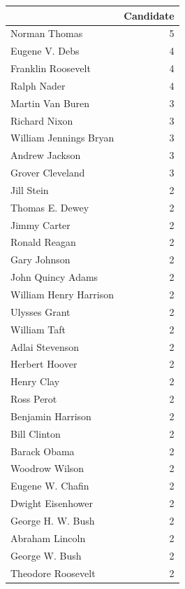\documentclass[
  letterpaper,
  DIV=11,
  numbers=noendperiod]{scrreprt}
\begin{document}
\begin{tabular}{lr}
\toprule
{} &  Candidate \\
\midrule
Norman Thomas          &          5 \\
Eugene V. Debs         &          4 \\
Franklin Roosevelt     &          4 \\
Ralph Nader            &          4 \\
Martin Van Buren       &          3 \\
Richard Nixon          &          3 \\
William Jennings Bryan &          3 \\
Andrew Jackson         &          3 \\
Grover Cleveland       &          3 \\
Jill Stein             &          2 \\
Thomas E. Dewey        &          2 \\
Jimmy Carter           &          2 \\
Ronald Reagan          &          2 \\
Gary Johnson           &          2 \\
John Quincy Adams      &          2 \\
William Henry Harrison &          2 \\
Ulysses Grant          &          2 \\
William Taft           &          2 \\
Adlai Stevenson        &          2 \\
Herbert Hoover         &          2 \\
Henry Clay             &          2 \\
Ross Perot             &          2 \\
Benjamin Harrison      &          2 \\
Bill Clinton           &          2 \\
Barack Obama           &          2 \\
Woodrow Wilson         &          2 \\
Eugene W. Chafin       &          2 \\
Dwight Eisenhower      &          2 \\
George H. W. Bush      &          2 \\
Abraham Lincoln        &          2 \\
George W. Bush         &          2 \\
Theodore Roosevelt     &          2 \\

\end{tabular}
\end{document}
